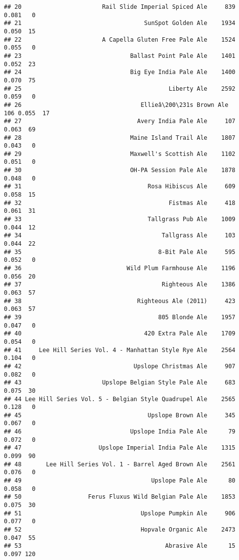 \documentclass[
]{article}
\begin{document}
\begin{verbatim}
## 20                       Rail Slide Imperial Spiced Ale     839 0.081   0
## 21                                   SunSpot Golden Ale    1934 0.050  15
## 22                       A Capella Gluten Free Pale Ale    1524 0.055   0
## 23                               Ballast Point Pale Ale    1401 0.052  23
## 24                               Big Eye India Pale Ale    1400 0.070  75
## 25                                          Liberty Ale    2592 0.059   0
## 26                                  Ellieâ\200\231s Brown Ale     106 0.055  17
## 27                                 Avery India Pale Ale     107 0.063  69
## 28                               Maine Island Trail Ale    1807 0.043   0
## 29                               Maxwell's Scottish Ale    1102 0.051   0
## 30                               OH-PA Session Pale Ale    1878 0.048   0
## 31                                    Rosa Hibiscus Ale     609 0.058  15
## 32                                          Fistmas Ale     418 0.061  31
## 33                                    Tallgrass Pub Ale    1009 0.044  12
## 34                                        Tallgrass Ale     103 0.044  22
## 35                                       8-Bit Pale Ale     595 0.052   0
## 36                              Wild Plum Farmhouse Ale    1196 0.056  20
## 37                                        Righteous Ale    1386 0.063  57
## 38                                 Righteous Ale (2011)     423 0.063  57
## 39                                       805 Blonde Ale    1957 0.047   0
## 40                                   420 Extra Pale Ale    1709 0.054   0
## 41     Lee Hill Series Vol. 4 - Manhattan Style Rye Ale    2564 0.104   0
## 42                                Upslope Christmas Ale     907 0.082   0
## 43                       Upslope Belgian Style Pale Ale     683 0.075  30
## 44 Lee Hill Series Vol. 5 - Belgian Style Quadrupel Ale    2565 0.128   0
## 45                                    Upslope Brown Ale     345 0.067   0
## 46                               Upslope India Pale Ale      79 0.072   0
## 47                      Upslope Imperial India Pale Ale    1315 0.099  90
## 48       Lee Hill Series Vol. 1 - Barrel Aged Brown Ale    2561 0.076   0
## 49                                     Upslope Pale Ale      80 0.058   0
## 50                   Ferus Fluxus Wild Belgian Pale Ale    1853 0.075  30
## 51                                  Upslope Pumpkin Ale     906 0.077   0
## 52                                  Hopvale Organic Ale    2473 0.047  55
## 53                                         Abrasive Ale      15 0.097 120

\end{verbatim}
\end{document}
